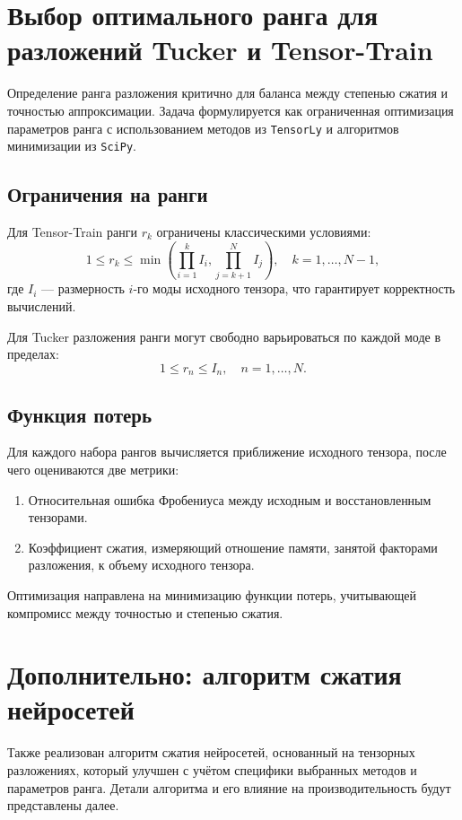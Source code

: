 \section{Выбор оптимального ранга для разложений Tucker и Tensor-Train}

Определение ранга разложения критично для баланса между степенью сжатия и точностью аппроксимации. Задача формулируется как ограниченная оптимизация параметров ранга с использованием методов из \texttt{TensorLy} и алгоритмов минимизации из \texttt{SciPy}.

\subsection*{Ограничения на ранги}

Для Tensor-Train ранги \(r_k\) ограничены классическими условиями:
\[
1 \le r_k \le \min \left(\prod_{i=1}^k I_i, \prod_{j=k+1}^N I_j\right), \quad k=1,\dots,N-1,
\]
где \(I_i\) — размерность \(i\)-го моды исходного тензора, что гарантирует корректность вычислений.

Для Tucker разложения ранги могут свободно варьироваться по каждой моде в пределах:
\[
1 \le r_n \le I_n, \quad n=1,\dots,N.
\]

\subsection*{Функция потерь}

Для каждого набора рангов вычисляется приближение исходного тензора, после чего оцениваются две метрики:

\begin{enumerate}
    \item Относительная ошибка Фробениуса между исходным и восстановленным тензорами.
    \item Коэффициент сжатия, измеряющий отношение памяти, занятой факторами разложения, к объему исходного тензора.
\end{enumerate}

Оптимизация направлена на минимизацию функции потерь, учитывающей компромисс между точностью и степенью сжатия.

\section{Дополнительно: алгоритм сжатия нейросетей}

Также реализован алгоритм сжатия нейросетей, основанный на тензорных разложениях, который улучшен с учётом специфики выбранных методов и параметров ранга. Детали алгоритма и его влияние на производительность будут представлены далее.

